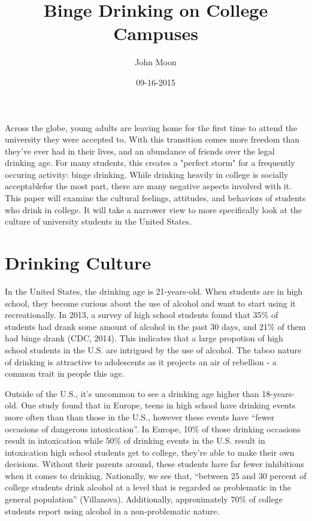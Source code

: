 \documentclass[12pt, man]{apa6}
\title{Binge Drinking on College Campuses}
\author{John Moon}
\affiliation{San Jose State University}
\date{09-16-2015}
\begin{document}
\maketitle

Across the globe, young adults are leaving home for the first time to attend the university they were accepted to. With this transition comes more freedom than they've ever had in their lives, and an abundance of friends over the legal drinking age. For many students, this creates a "perfect storm" for a frequently occuring activity: binge drinking. While drinking heavily in college is socially acceptablefor the most part, there are many negative aspects involved with it. This paper will examine the cultural feelings, attitudes, and behaviors of students who drink in college. It will take a narrower view to more specifically look at the culture of university students in the United States.

\section{Drinking Culture}
In the United States, the drinking age is 21-years-old. When students are in high school, they become curious about the use of alcohol and want to start using it recreationally. In 2013, a survey of high school students found that 35\% of students had drank some amount of alcohol in the past 30 days, and 21\% of them had binge drank (CDC, 2014). This indicates that a large propotion of high school students in the U.S. are intrigued by the use of alcohol. The taboo nature of drinking is attractive to adolescents as it projects an air of rebellion - a common trait in people this age.

Outside of the U.S., it's uncommon to see a drinking age higher than 18-years-old. One study found that in Europe, teens in high school have drinking events more often than than those in the U.S., however these events have ``fewer occasions of dangerous intoxication''. In Europe, 10\% of those drinking occasions result in intoxication while 50\% of drinking events in the U.S. result in intoxication high school students get to college, they're able to make their own decisions. Without their parents around, these students have far fewer inhibitions when it comes to drinking. Nationally, we see that, ``between 25 and 30 percent of college students drink alcohol at a level that is regarded as problematic in the general population'' (Villanova). Additionally, approximately 70\% of college students report using alcohol in a non-problematic nature.
\end{document}
